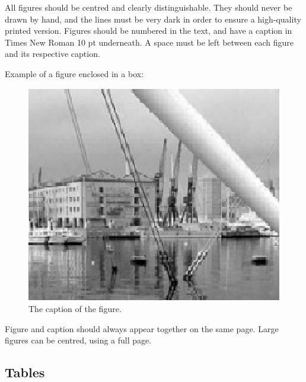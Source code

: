 \documentclass{lrec}
\begin{document}
All figures should be centred and clearly distinguishable. They should never be
drawn by hand, and the lines must be very dark in order to ensure a high-quality
printed version. Figures should be numbered in the text, and have a caption in
Times New Roman 10 pt underneath. A space must be left between each figure and
its respective caption.

Example of a figure enclosed in a box:

\begin{figure}[!h]
\begin{center}
\includegraphics[scale=0.5]{image1.eps}
\caption{The caption of the figure.}
\label{fig.1}
\end{center}
\end{figure}

Figure and caption should always appear together on the same page. Large figures
can be centred, using a full page.

\subsection{Tables}
\end{document}
